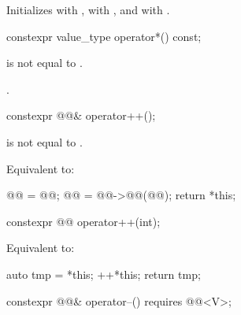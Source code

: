 \begin{itemdescr}
\pnum
\effects
Initializes  with ,
 with , and
 with .
\end{itemdescr}

%
\begin{itemdecl}
constexpr value_type operator*() const;
\end{itemdecl}

\begin{itemdescr}
\pnum
\expects
{} is not equal to .

\pnum
\returns
{}.
\end{itemdescr}

%
\begin{itemdecl}
constexpr @@& operator++();
\end{itemdecl}

\begin{itemdescr}
\pnum
\expects
{} is not equal to .

\pnum
\effects
Equivalent to:
\begin{codeblock}
@@ = @@;
@@ = @@->@@(@@);
return *this;
\end{codeblock}
\end{itemdescr}

%
\begin{itemdecl}
constexpr @@ operator++(int);
\end{itemdecl}

\begin{itemdescr}
\pnum
\effects
Equivalent to:
\begin{codeblock}
auto tmp = *this;
++*this;
return tmp;
\end{codeblock}
\end{itemdescr}

%
\begin{itemdecl}
constexpr @@& operator--() requires @@<V>;
\end{itemdecl}

